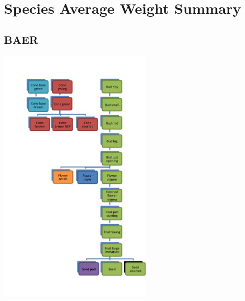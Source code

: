 \documentclass[10pt]{book} %
\begin{document}
\chapter{Species Average Weight Summary}
\newpage
\footnotesize



\clearpage
\newpage
\section{BAER}
\begin{multicols}{2}
\includegraphics[width=3in]{BAER.png}
\vfill
\columnbreak

\end{multicols}



\clearpage
\newpage
\end{document}

